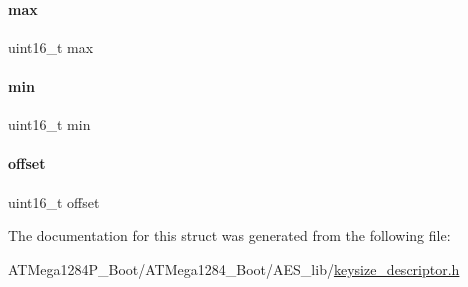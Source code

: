 \paragraph{\texorpdfstring{max}{max}}
{\footnotesize\ttfamily uint16\+\_\+t max}

\mbox{\label{structkeysize__desc__arg__range__t_a1a1f4624f66ab0b2eb0b98316514c369}} 
\paragraph{\texorpdfstring{min}{min}}
{\footnotesize\ttfamily uint16\+\_\+t min}

\mbox{\label{structkeysize__desc__arg__range__t_ac681806181c80437cfab37335f62ff39}} 
\paragraph{\texorpdfstring{offset}{offset}}
{\footnotesize\ttfamily uint16\+\_\+t offset}



The documentation for this struct was generated from the following file\+:\begin{DoxyCompactItemize}
\item 
A\+T\+Mega1284\+P\+\_\+\+Boot/\+A\+T\+Mega1284\+\_\+\+Boot/\+A\+E\+S\+\_\+lib/\hyperlink{_a_t_mega1284_p___boot_2_a_t_mega1284___boot_2_a_e_s__lib_2keysize__descriptor_8h}{keysize\+\_\+descriptor.\+h}\end{DoxyCompactItemize}
